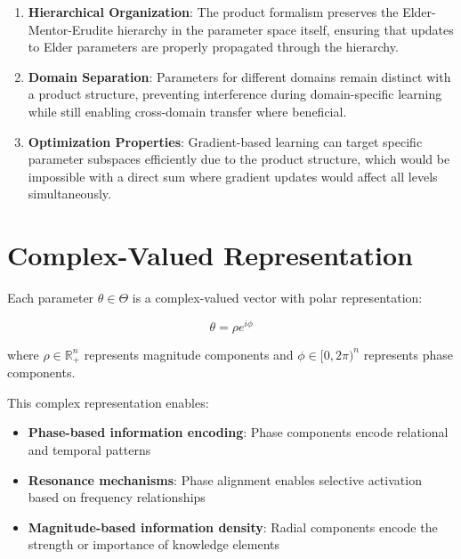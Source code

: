 \begin{definition}
\begin{enumerate}
    \item \textbf{Hierarchical Organization}: The product formalism preserves the Elder-Mentor-Erudite hierarchy in the parameter space itself, ensuring that updates to Elder parameters are properly propagated through the hierarchy.
    
    \item \textbf{Domain Separation}: Parameters for different domains remain distinct with a product structure, preventing interference during domain-specific learning while still enabling cross-domain transfer where beneficial.
    
    \item \textbf{Optimization Properties}: Gradient-based learning can target specific parameter subspaces efficiently due to the product structure, which would be impossible with a direct sum where gradient updates would affect all levels simultaneously.
\end{enumerate}
\end{definition}

\section{Complex-Valued Representation}

\begin{definition}
Each parameter $\theta \in \Theta$ is a complex-valued vector with polar representation:

\begin{equation}
\theta = \rho e^{i\phi}
\end{equation}

where $\rho \in \mathbb{R}^n_+$ represents magnitude components and $\phi \in [0, 2\pi)^n$ represents phase components.
\end{definition}

This complex representation enables:
\begin{itemize}
    \item \textbf{Phase-based information encoding}: Phase components encode relational and temporal patterns
    \item \textbf{Resonance mechanisms}: Phase alignment enables selective activation based on frequency relationships
    \item \textbf{Magnitude-based information density}: Radial components encode the strength or importance of knowledge elements
\end{itemize}

